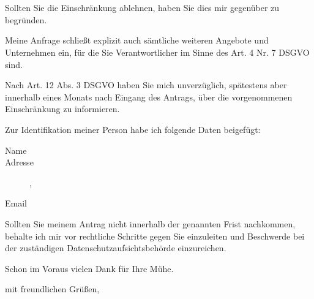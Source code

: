 \documentclass[a4paper, pagenumber=footmiddle, parskip=half,
	foldmarks=true,foldmarks=BmT, fromalign=right,
	fromphone=false, fromfax=false, fromemail=true, fromurl=false, fromlogo=false,
	fromrule=false, version=last]{scrlttr2}
\begin{document}
\begin{letter}{
	\EmpfaengerName\\
	\EmpfaengerStrasse\\
	\EmpfaengerStadt
}
Sollten Sie die Einschränkung ablehnen, haben Sie dies mir gegenüber zu begründen.

Meine Anfrage schließt explizit auch sämtliche weiteren Angebote und Unternehmen ein, für die Sie Verantwortlicher im Sinne des Art. 4 Nr. 7 DSGVO sind.

Nach Art. 12 Abs. 3 DSGVO haben Sie mich unverzüglich, spätestens aber innerhalb eines Monats nach Eingang des Antrags, über die vorgenommenen Einschränkung zu informieren.

\vspace*{15mm}
Zur Identifikation meiner Person habe ich folgende Daten beigefügt:
\begin{description}
	\item[Name] \meinName{}
	\item[Adresse] \meineStrasse{}, \meineStadt{}
	\item[Email] \meineEmail{}  
\end{description}
\vspace*{5mm}

Sollten Sie meinem Antrag nicht innerhalb der genannten Frist nachkommen, behalte ich mir vor rechtliche Schritte gegen Sie einzuleiten und Beschwerde bei der zuständigen Datenschutzaufsichtsbehörde einzureichen.

Schon im Voraus vielen Dank für Ihre Mühe.


\closing{mit freundlichen Grüßen,}


\end{letter}
\end{document}
